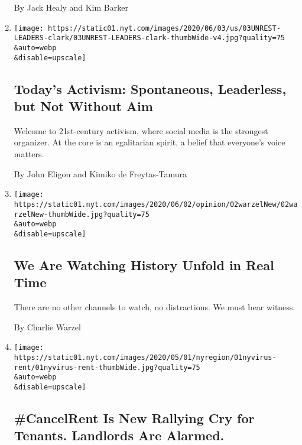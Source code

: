 \begin{enumerate}
  By Jack Healy and Kim Barker
\item
  \href{/2020/06/03/us/leaders-activists-george-floyd-protests.html}{}

  \texttt{[image: https://static01.nyt.com/images/2020/06/03/us/03UNREST-LEADERS-clark/03UNREST-LEADERS-clark-thumbWide-v4.jpg?quality=75\\\&auto=webp\\\&disable=upscale]}

  \hypertarget{todays-activism-spontaneous-leaderless-but-not-without-aim}{%
  \subsection{Today's Activism: Spontaneous, Leaderless, but Not Without
  Aim}\label{todays-activism-spontaneous-leaderless-but-not-without-aim}}

  Welcome to 21st-century activism, where social media is the strongest
  organizer. At the core is an egalitarian spirit, a belief that
  everyone's voice matters.

  By John Eligon and Kimiko de Freytas-Tamura
\item
  \href{/2020/06/02/opinion/floyd-protest-twitter.html}{}

  \texttt{[image: https://static01.nyt.com/images/2020/06/02/opinion/02warzelNew/02warzelNew-thumbWide.jpg?quality=75\\\&auto=webp\\\&disable=upscale]}

  \hypertarget{we-are-watching-history-unfold-in-real-time}{%
  \subsection{We Are Watching History Unfold in Real
  Time}\label{we-are-watching-history-unfold-in-real-time}}

  There are no other channels to watch, no distractions. We must bear
  witness.

  By Charlie Warzel
\item
  \href{/2020/05/01/nyregion/rent-strike-coronavirus.html}{}

  \texttt{[image: https://static01.nyt.com/images/2020/05/01/nyregion/01nyvirus-rent/01nyvirus-rent-thumbWide.jpg?quality=75\\\&auto=webp\\\&disable=upscale]}

  \hypertarget{cancelrent-is-new-rallying-cry-for-tenants-landlords-are-alarmed}{%
  \subsection{\#CancelRent Is New Rallying Cry for Tenants. Landlords
  Are
  Alarmed.}\label{cancelrent-is-new-rallying-cry-for-tenants-landlords-are-alarmed}}


\end{enumerate}
